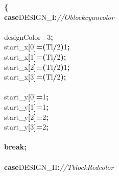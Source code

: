 \documentclass[a4paper, 10pt]{article}
\newcommand\SPC{\hspace*{0.6em}}
\newcommand\HYP{\mbox{\char 45}}
\newcommand{\CppAComment}[1]{\textit{\textcolor[rgb]{0.2,0.6,1}{#1}}}
\newcommand{\CppAIdentifier}[1]{#1}
\newcommand{\CppANumber}[1]{\textcolor[rgb]{0.5,0,0.5}{#1}}
\newcommand{\CppAReservedWord}[1]{\textbf{#1}}
\newcommand{\CppASpace}[1]{\colorbox[rgb]{1,1,1}{#1}}
\newcommand{\CppASymbol}[1]{\textbf{\textcolor[rgb]{1,0,0}{#1}}}
\begin{document}
\begin{ttfamily}
\CppASpace{\SPC }\CppASymbol{\{}\\
\CppASpace{\SPC \SPC }\CppAReservedWord{case}\CppASpace{\SPC }\CppAIdentifier{DESIGN\_I}\CppASymbol{:}\CppASpace{\SPC \SPC \SPC \SPC \SPC }\CppAComment{//\SPC O\SPC block\SPC cyan\SPC color}\\
\\
\CppASpace{\SPC \SPC }\CppAIdentifier{designColor}\CppASymbol{=}\CppANumber{3}\CppASymbol{;}\\
\CppASpace{\SPC \SPC }\CppAIdentifier{start\_x}\CppASymbol{[}\CppANumber{0}\CppASymbol{]}\CppASymbol{=}\CppASymbol{(}\CppAIdentifier{Tl}\CppASymbol{/}\CppANumber{2}\CppASymbol{)}\CppASymbol{\HYP }\CppANumber{1}\CppASymbol{;}\\
\CppASpace{\SPC \SPC }\CppAIdentifier{start\_x}\CppASymbol{[}\CppANumber{1}\CppASymbol{]}\CppASymbol{=}\CppASymbol{(}\CppAIdentifier{Tl}\CppASymbol{/}\CppANumber{2}\CppASymbol{)}\CppASymbol{;}\\
\CppASpace{\SPC \SPC }\CppAIdentifier{start\_x}\CppASymbol{[}\CppANumber{2}\CppASymbol{]}\CppASymbol{=}\CppASymbol{(}\CppAIdentifier{Tl}\CppASymbol{/}\CppANumber{2}\CppASymbol{)}\CppASymbol{\HYP }\CppANumber{1}\CppASymbol{;}\\
\CppASpace{\SPC \SPC }\CppAIdentifier{start\_x}\CppASymbol{[}\CppANumber{3}\CppASymbol{]}\CppASymbol{=}\CppASymbol{(}\CppAIdentifier{Tl}\CppASymbol{/}\CppANumber{2}\CppASymbol{)}\CppASymbol{;}\\
\\
\CppASpace{\SPC \SPC }\CppAIdentifier{start\_y}\CppASymbol{[}\CppANumber{0}\CppASymbol{]}\CppASymbol{=}\CppANumber{1}\CppASymbol{;}\\
\CppASpace{\SPC \SPC }\CppAIdentifier{start\_y}\CppASymbol{[}\CppANumber{1}\CppASymbol{]}\CppASymbol{=}\CppANumber{1}\CppASymbol{;}\\
\CppASpace{\SPC \SPC }\CppAIdentifier{start\_y}\CppASymbol{[}\CppANumber{2}\CppASymbol{]}\CppASymbol{=}\CppANumber{2}\CppASymbol{;}\\
\CppASpace{\SPC \SPC }\CppAIdentifier{start\_y}\CppASymbol{[}\CppANumber{3}\CppASymbol{]}\CppASymbol{=}\CppANumber{2}\CppASymbol{;}\\
\\
\CppASpace{\SPC \SPC }\CppAReservedWord{break}\CppASymbol{;}\\
\\
\CppASpace{\SPC \SPC }\CppAReservedWord{case}\CppASpace{\SPC }\CppAIdentifier{DESIGN\_II}\CppASymbol{:}\CppASpace{\SPC \SPC \SPC \SPC \SPC \SPC \SPC \SPC \SPC }\CppAComment{//\SPC T\SPC block\SPC Red\SPC color}\\

\end{ttfamily}
\end{document}
